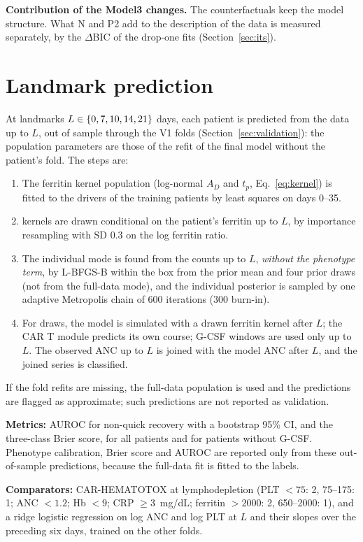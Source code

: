 \documentclass[11pt]{article}
\begin{document}
\textbf{Contribution of the Model3 changes.} The counterfactuals keep the model structure. What N and P2 add to the description of the data is measured separately, by the $\Delta$BIC of the drop-one fits (Section~\ref{sec:its}).

\section{Landmark prediction}\label{sec:landmark}
At landmarks $L\in\{0, 7, 10, 14, 21\}$ days, each patient is predicted from the data up to $L$, out of sample through the V1 folds (Section~\ref{sec:validation}): the population parameters are those of the refit of the final model without the patient's fold. The steps are:
\begin{enumerate}
\item The ferritin kernel population (log-normal $A_D$ and $t_p$, Eq.~\ref{eq:kernel}) is fitted to the drivers of the training patients by least squares on days 0--35.
\item \valFKernel{} kernels are drawn conditional on the patient's ferritin up to $L$, by importance resampling with SD 0.3 on the log ferritin ratio.
\item The individual mode is found from the counts up to $L$, \emph{without the phenotype term}, by L-BFGS-B within the box from the prior mean and four prior draws (not from the full-data mode), and the individual posterior is sampled by one adaptive Metropolis chain of 600 iterations (300 burn-in).
\item For \valFDraws{} draws, the model is simulated with a drawn ferritin kernel after $L$; the CAR T module predicts its own course; G-CSF windows are used only up to $L$. The observed ANC up to $L$ is joined with the model ANC after $L$, and the joined series is classified.
\end{enumerate}
If the fold refits are missing, the full-data population is used and the predictions are flagged as approximate; such predictions are not reported as validation.

\textbf{Metrics:} AUROC for non-quick recovery with a bootstrap 95\% CI, and the three-class Brier score, for all patients and for patients without G-CSF. Phenotype calibration, Brier score and AUROC are reported only from these out-of-sample predictions, because the full-data fit is fitted to the labels.

\textbf{Comparators:} CAR-HEMATOTOX at lymphodepletion \citep{rejeski2021} (PLT $<75$: 2, 75--175: 1; ANC $<1.2$; Hb $<9$; CRP $\geq3$~mg/dL; ferritin $>2000$: 2, 650--2000: 1), and a ridge logistic regression on log ANC and log PLT at $L$ and their slopes over the preceding six days, trained on the other folds.
\end{document}
